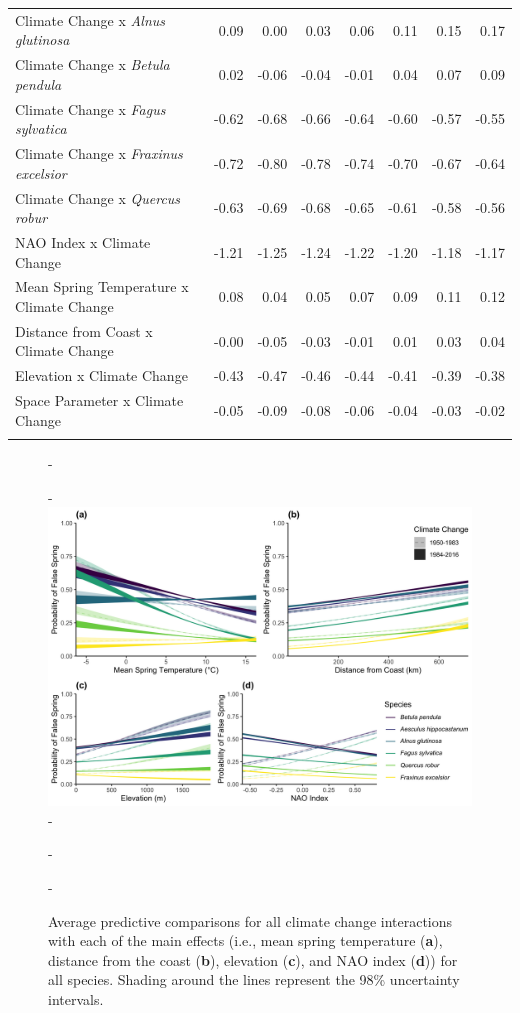 \documentclass{article}\usepackage[]{graphicx}\usepackage[]{color}
\begin{document}
\begin{longtable}{lrrrrrrr}
  Climate Change
x\textit{ Alnus glutinosa} & 0.09 & 0.00 & 0.03 & 0.06 & 0.11 & 0.15 & 0.17 \\ 
  Climate Change
x\textit{ Betula pendula} & 0.02 & -0.06 & -0.04 & -0.01 & 0.04 & 0.07 & 0.09 \\ 
  Climate Change
x\textit{ Fagus sylvatica} & -0.62 & -0.68 & -0.66 & -0.64 & -0.60 & -0.57 & -0.55 \\ 
  Climate Change
x\textit{ Fraxinus excelsior} & -0.72 & -0.80 & -0.78 & -0.74 & -0.70 & -0.67 & -0.64 \\ 
  Climate Change
x\textit{ Quercus robur} & -0.63 & -0.69 & -0.68 & -0.65 & -0.61 & -0.58 & -0.56 \\ 
  NAO Index x Climate Change & -1.21 & -1.25 & -1.24 & -1.22 & -1.20 & -1.18 & -1.17 \\ 
  Mean Spring 
Temperature x Climate Change & 0.08 & 0.04 & 0.05 & 0.07 & 0.09 & 0.11 & 0.12 \\ 
  Distance from 
Coast x Climate Change & -0.00 & -0.05 & -0.03 & -0.01 & 0.01 & 0.03 & 0.04 \\ 
  Elevation x Climate Change & -0.43 & -0.47 & -0.46 & -0.44 & -0.41 & -0.39 & -0.38 \\ 
  Space Parameter x Climate Change & -0.05 & -0.09 & -0.08 & -0.06 & -0.04 & -0.03 & -0.02 \\ 
   \hline
\hline
\label{tab:suppmodlongtemps}
\end{longtable}


{\begin{figure} [H]
  -\begin{center}
  -\includegraphics[width=16cm]{..//..//analyses/figures/APC_allpred_allspp_baseR_long98.png}
  -\caption{Average predictive comparisons for all climate change interactions with each of the main effects (i.e., mean spring temperature (\textbf{a}), distance from the coast (\textbf{b}), elevation (\textbf{c}), and NAO index (\textbf{d})) for all species. Shading around the lines represent the 98\% uncertainty intervals. }\label{fig:suppapc}
  -\end{center}
  -\end{figure}}
  
\end{document}
